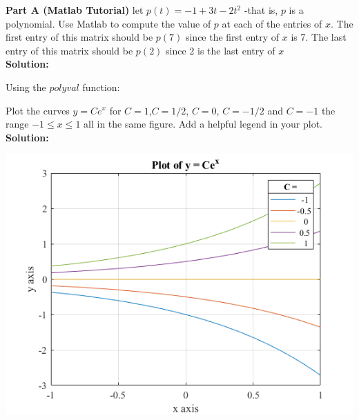 \documentclass[12pt]{article}
\makeatletter
\theoremstyle{homework}
\newenvironment{exercise}[1]
{\def\@currentlabel{#1}\exercisecore}
{\endexercisecore}
\makeatother
\begin{document}
\textbf{Part A (Matlab Tutorial)}
\begin{exercise}{5}
let $p(t) = -1+3t-2t^2$ -that is, $p$ is a polynomial. Use Matlab to compute the value of $p$
at each of the entries of $x$. The first entry of this matrix should be $p(7)$ since the first entry of $x$ is 7. 
The last entry of this matrix should be $p(2)$ since 2 is the last entry of $x$ \\

\textbf{Solution:}

Using the $polyval$ function:

\end{exercise}

\vspace{1in}



\begin{exercise}{7} Plot the curves $y = Ce^x$ for $C = 1$,$C = 1/2$, $C = 0$, $C = -1/2$ and $C = -1$ 
  the range $-1 \leq x \leq 1$ all in the same figure. Add a helpful legend in your plot.\\

  \textbf{Solution:}
  
  \includegraphics[width=\textwidth]{ex7.png}

  
\end{exercise}

\vspace{1in}
\end{document}
